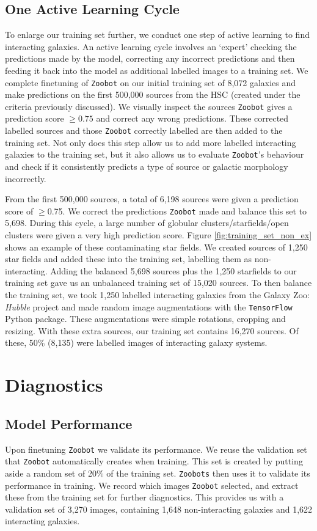 \subsection{One Active Learning Cycle}
\noindent To enlarge our training set further, we conduct one step of active learning to find interacting galaxies. An active learning cycle involves an `expert' checking the predictions made by the model, correcting any incorrect predictions and then feeding it back into the model as additional labelled images to a training set. We complete finetuning of \texttt{Zoobot} on our initial training set of 8,072 galaxies and make predictions on the first 500,000 sources from the HSC (created under the criteria previously discussed). We visually inspect the sources \texttt{Zoobot} gives a prediction score $\geq0.75$ and correct any wrong predictions. These corrected labelled sources and those \texttt{Zoobot} correctly labelled are then added to the training set. Not only does this step allow us to add more labelled interacting galaxies to the training set, but it also allows us to evaluate \texttt{Zoobot}'s behaviour and check if it consistently predicts a type of source or galactic morphology incorrectly.

From the first 500,000 sources, a total of 6,198 sources were given a prediction score of $\geq$0.75. We correct the predictions \texttt{Zoobot} made and balance this set to 5,698. During this cycle, a large number of globular clusters/starfields/open clusters were given a very high prediction score. Figure \ref{fig:training_set_non_ex} shows an example of these contaminating star fields. We created sources of 1,250 star fields and added these into the training set, labelling them as non-interacting. Adding the balanced 5,698 sources plus the 1,250 starfields to our training set gave us an unbalanced training set of 15,020 sources. To then balance the training set, we took 1,250 labelled interacting galaxies from the Galaxy Zoo: \emph{Hubble} project and made random image augmentations with the \texttt{TensorFlow} Python package. These augmentations were simple rotations, cropping and resizing. With these extra sources, our training set contains 16,270 sources. Of these, 50\% (8,135) were labelled images of interacting galaxy systems.



\section{Diagnostics}\label{diagnostics}
\subsection{Model Performance} \label{performance}
\noindent Upon finetuning \texttt{Zoobot} we validate its performance. We reuse the validation set that \texttt{Zoobot} automatically creates when training. This set is created by putting aside a random set of 20\% of the training set. \texttt{Zoobots} then uses it to validate its performance in training. We record which images \texttt{Zoobot} selected, and extract these from the training set for further diagnostics. This provides us with a validation set of 3,270 images, containing 1,648 non-interacting galaxies and 1,622 interacting galaxies.

